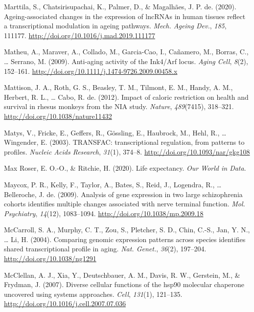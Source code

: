 \documentclass[12pt,twoside]{unicam}
\begin{document}
\begin{cslreferences}
\leavevmode\hypertarget{ref-Marttila2020}{}%
Marttila, S., Chatsirisupachai, K., Palmer, D., \& Magalhães, J. P. de. (2020). Ageing-associated changes in the expression of lncRNAs in human tissues reflect a transcriptional modulation in ageing pathways. \emph{Mech. Ageing Dev.}, \emph{185}, 111177. \url{http://doi.org/10.1016/j.mad.2019.111177}

\leavevmode\hypertarget{ref-Matheu2009}{}%
Matheu, A., Maraver, A., Collado, M., Garcia-Cao, I., Cañamero, M., Borras, C., \ldots{} Serrano, M. (2009). Anti-aging activity of the Ink4/Arf locus. \emph{Aging Cell}, \emph{8}(2), 152--161. \url{http://doi.org/10.1111/j.1474-9726.2009.00458.x}

\leavevmode\hypertarget{ref-Mattison2012}{}%
Mattison, J. A., Roth, G. S., Beasley, T. M., Tilmont, E. M., Handy, A. M., Herbert, R. L., \ldots{} Cabo, R. de. (2012). Impact of caloric restriction on health and survival in rhesus monkeys from the NIA study. \emph{Nature}, \emph{489}(7415), 318--321. \url{http://doi.org/10.1038/nature11432}

\leavevmode\hypertarget{ref-Matys2003}{}%
Matys, V., Fricke, E., Geffers, R., Gössling, E., Haubrock, M., Hehl, R., \ldots{} Wingender, E. (2003). TRANSFAC: transcriptional regulation, from patterns to profiles. \emph{Nucleic Acids Research}, \emph{31}(1), 374--8. \url{http://doi.org/10.1093/nar/gkg108}

\leavevmode\hypertarget{ref-Roser2020}{}%
Max Roser, E. O.-O., \& Ritchie, H. (2020). Life expectancy. \emph{Our World in Data}.

\leavevmode\hypertarget{ref-Maycox2009}{}%
Maycox, P. R., Kelly, F., Taylor, A., Bates, S., Reid, J., Logendra, R., \ldots{} Belleroche, J. de. (2009). Analysis of gene expression in two large schizophrenia cohorts identifies multiple changes associated with nerve terminal function. \emph{Mol. Psychiatry}, \emph{14}(12), 1083--1094. \url{http://doi.org/10.1038/mp.2009.18}

\leavevmode\hypertarget{ref-McCarroll2004}{}%
McCarroll, S. A., Murphy, C. T., Zou, S., Pletcher, S. D., Chin, C.-S., Jan, Y. N., \ldots{} Li, H. (2004). Comparing genomic expression patterns across species identifies shared transcriptional profile in aging. \emph{Nat. Genet.}, \emph{36}(2), 197--204. \url{http://doi.org/10.1038/ng1291}

\leavevmode\hypertarget{ref-McClellan2007}{}%
McClellan, A. J., Xia, Y., Deutschbauer, A. M., Davis, R. W., Gerstein, M., \& Frydman, J. (2007). Diverse cellular functions of the hsp90 molecular chaperone uncovered using systems approaches. \emph{Cell}, \emph{131}(1), 121--135. \url{http://doi.org/10.1016/j.cell.2007.07.036}


\end{cslreferences}
\end{document}
